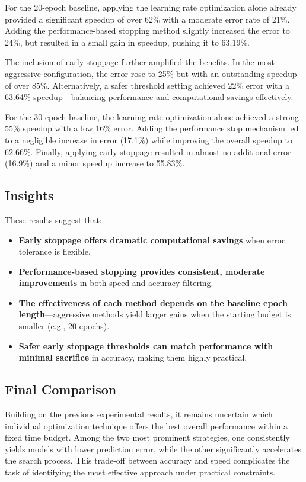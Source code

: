 For the 20-epoch baseline, applying the learning rate optimization alone already provided a significant speedup of over 62\% with a moderate error rate of 21\%. Adding the performance-based stopping method slightly increased the error to 24\%, but resulted in a small gain in speedup, pushing it to 63.19\%.

The inclusion of early stoppage further amplified the benefits. In the most aggressive configuration, the error rose to 25\% but with an outstanding speedup of over 85\%. Alternatively, a safer threshold setting achieved 22\% error with a 63.64\% speedup—balancing performance and computational savings effectively.

For the 30-epoch baseline, the learning rate optimization alone achieved a strong 55\% speedup with a low 16\% error. Adding the performance stop mechanism led to a negligible increase in error (17.1\%) while improving the overall speedup to 62.66\%. Finally, applying early stoppage resulted in almost no additional error (16.9\%) and a minor speedup increase to 55.83\%.

\subsection*{Insights}

These results suggest that:
\begin{itemize}
    \item \textbf{Early stoppage offers dramatic computational savings} when error tolerance is flexible.
    \item \textbf{Performance-based stopping provides consistent, moderate improvements} in both speed and accuracy filtering.
    \item \textbf{The effectiveness of each method depends on the baseline epoch length}—aggressive methods yield larger gains when the starting budget is smaller (e.g., 20 epochs).
    \item \textbf{Safer early stoppage thresholds can match performance with minimal sacrifice} in accuracy, making them highly practical.
\end{itemize}

\vspace{2.5\baselineskip}

\subsection{Final Comparison}

Building on the previous experimental results, it remains uncertain which individual optimization technique offers the best overall performance within a fixed time budget. Among the two most prominent strategies, one consistently yields models with lower prediction error, while the other significantly accelerates the search process. This trade-off between accuracy and speed complicates the task of identifying the most effective approach under practical constraints.

